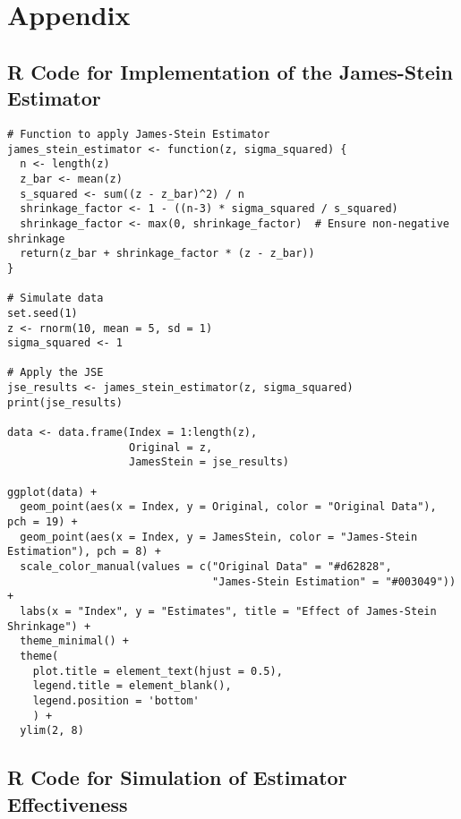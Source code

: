 \section{Appendix}

\subsection{R Code for Implementation of the James-Stein Estimator}

\begin{verbatim}
# Function to apply James-Stein Estimator
james_stein_estimator <- function(z, sigma_squared) {
  n <- length(z)
  z_bar <- mean(z)
  s_squared <- sum((z - z_bar)^2) / n
  shrinkage_factor <- 1 - ((n-3) * sigma_squared / s_squared)
  shrinkage_factor <- max(0, shrinkage_factor)  # Ensure non-negative shrinkage
  return(z_bar + shrinkage_factor * (z - z_bar))
}

# Simulate data
set.seed(1)
z <- rnorm(10, mean = 5, sd = 1)
sigma_squared <- 1

# Apply the JSE
jse_results <- james_stein_estimator(z, sigma_squared)
print(jse_results)

data <- data.frame(Index = 1:length(z),
                   Original = z,
                   JamesStein = jse_results)

ggplot(data) +
  geom_point(aes(x = Index, y = Original, color = "Original Data"), pch = 19) +
  geom_point(aes(x = Index, y = JamesStein, color = "James-Stein Estimation"), pch = 8) +
  scale_color_manual(values = c("Original Data" = "#d62828", 
                                "James-Stein Estimation" = "#003049")) +
  labs(x = "Index", y = "Estimates", title = "Effect of James-Stein Shrinkage") +
  theme_minimal() +
  theme(
    plot.title = element_text(hjust = 0.5),
    legend.title = element_blank(),
    legend.position = 'bottom'
    ) +
  ylim(2, 8)
\end{verbatim}

\subsection{R Code for Simulation of Estimator Effectiveness}

